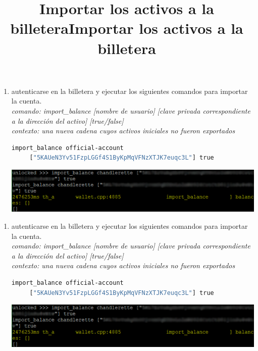 \documentclass{article}
\begin{document}
\title{Importar los activos a la billetera}
\begin{enumerate}
    \item autenticarse en la billetera y ejecutar los siguientes comandos para importar la cuenta.\\
    \emph{comando: import\_balance [nombre de usuario] [clave privada correspondiente a la dirección del activo] [true/false]  }\\
    \emph{contexto: una nueva cadena cuyos activos iniciales no fueron exportados}\\
    \begin{lstlisting}[language=bash,caption={importar claves privadas}]
     import_balance official-account
     ["5KAUeN3Yv51FzpLGGf4S1ByKpMqVFNzXTJK7euqc3L"] true
    \end{lstlisting}
    \includegraphics{transfer-4}
\end{enumerate}


\title{Importar los activos a la billetera}
\begin{enumerate}
    \item autenticarse en la billetera y ejecutar los siguientes comandos para importar la cuenta.\\
    \emph{comando: import\_balance [nombre de usuario] [clave privada correspondiente a la dirección del activo] [true/false]  }\\
    \emph{contexto: una nueva cadena cuyos activos iniciales no fueron exportados}\\
    \begin{lstlisting}[language=bash,caption={importar claves privadas}]
     import_balance official-account
     ["5KAUeN3Yv51FzpLGGf4S1ByKpMqVFNzXTJK7euqc3L"] true
    \end{lstlisting}
    \includegraphics{transfer-4}
\end{enumerate}
\end{document}
